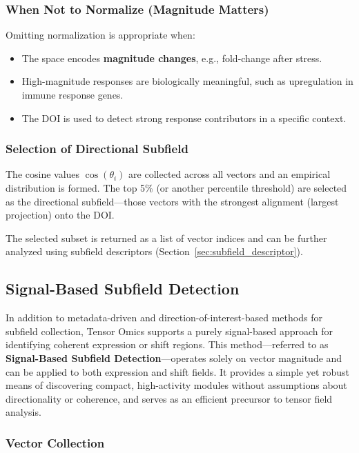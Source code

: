 \documentclass{article}
\begin{document}
\subsubsection{When Not to Normalize (Magnitude Matters)}

Omitting normalization is appropriate when:
\begin{itemize}
    \item The space encodes \textbf{magnitude changes}, e.g., fold-change after stress.
    \item High-magnitude responses are biologically meaningful, such as upregulation in immune response genes.
    \item The DOI is used to detect strong response contributors in a specific context.
\end{itemize}

\subsubsection{Selection of Directional Subfield}

The cosine values \( \cos(\theta_i) \) are collected across all vectors and an empirical distribution is formed. The top 5\% (or another percentile threshold) are selected as the directional subfield—those vectors with the strongest alignment (largest projection) onto the DOI.

The selected subset is returned as a list of vector indices and can be further analyzed using subfield descriptors (Section~\ref{sec:subfield_descriptor}).

\subsection{Signal-Based Subfield Detection}
\label{sec:signal_based_subfield_detection}

In addition to metadata-driven and direction-of-interest-based methods for subfield collection, Tensor Omics supports a purely signal-based approach for identifying coherent expression or shift regions. This method—referred to as \textbf{Signal-Based Subfield Detection}—operates solely on vector magnitude and can be applied to both expression and shift fields. It provides a simple yet robust means of discovering compact, high-activity modules without assumptions about directionality or coherence, and serves as an efficient precursor to tensor field analysis.

\subsubsection{Vector Collection}
\end{document}

